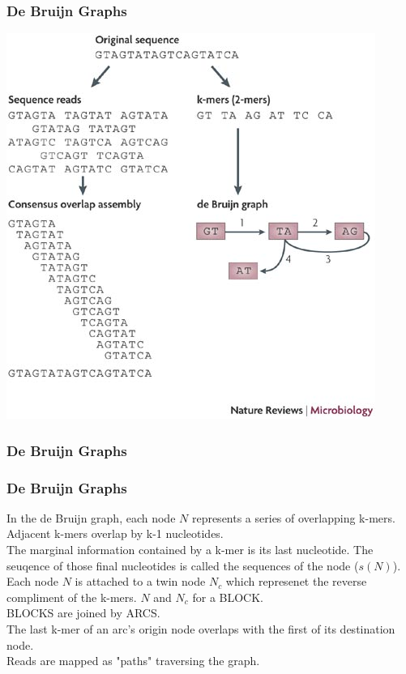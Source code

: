\documentclass[pdf]{beamer}
\begin{document}
\begin{frame}
\frametitle{De Bruijn Graphs}
\begin{center}
\includegraphics[scale=0.45]{Figures/smallEx.jpg} 
\end{center}
\end{frame}

\begin{frame}
\frametitle{De Bruijn Graphs}
\begin{center}

\end{center}
\end{frame}

\begin{frame}
\frametitle{De Bruijn Graphs}
In the de Bruijn graph, each node $N$ represents a series of overlapping k-mers. Adjacent k-mers overlap by k-1 nucleotides.\\
\vspace{0.2in}
The marginal information contained by a k-mer is its last nucleotide. The seuqence of those final nucleotides is called the sequences of the node ($s(N)$). Each node $N$ is attached to a twin node $N_c$ which represenet the reverse compliment of the k-mers. $N$ and $N_c$ for a BLOCK.\\
\vspace{0.2in}
BLOCKS are joined by ARCS.\\
The last k-mer of an arc's origin node overlaps with the first of its destination node.\\
Reads are mapped as "paths" traversing the graph.
\end{frame}
\end{document}
